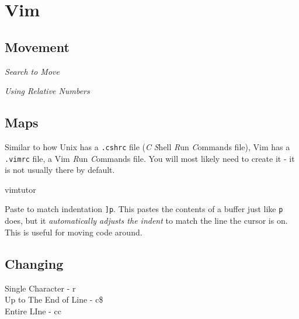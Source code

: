\chapter{Vim}


\section{Movement}


\frmrule 

\textit{Search to Move}






\frmrule 

\textit{Using Relative Numbers}




\section{Maps}

Similar to how Unix has a \lstinline{.cshrc} file
(\textit{C} \textit{S}hell \textit{R}un \textit{C}ommands file), 
Vim has a \lstinline{.vimrc} file, a Vim \textit{R}un \textit{C}ommands file.
You will most likely need to create it - it is not usually there by default.


\begin{sidenote}{vimtutor}
 
\end{sidenote}




\begin{sidenote}{Paste to match indentation}
\lstinline{]p}. This pastes the contents of a buffer just like \lstinline{p} does, 
but it \textit{automatically adjusts the indent} to match the line the cursor is on. 
This is useful for moving code around.
\end{sidenote}


\section{Changing}

Single Character - r \\
Up to The End of Line - c\$ \\
Entire LIne - cc 
